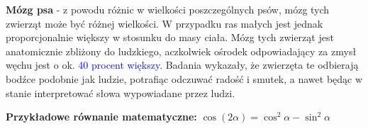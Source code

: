 \textbf{Mózg psa} - z powodu różnic w wielkości poszczególnych psów, mózg tych zwierząt może być różnej wielkości. W przypadku ras małych jest jednak proporcjonalnie większy w stosunku do masy ciała. Mózg tych zwierząt jest anatomicznie zbliżony do ludzkiego, aczkolwiek ośrodek odpowiadający za zmysł węchu jest o ok. \textcolor{blue}{40 procent większy}. Badania wykazały, że zwierzęta te odbierają bodźce podobnie jak ludzie, potrafiąc odczuwać radość i smutek, a nawet będąc w stanie interpretować słowa wypowiadane przez ludzi.

\hspace{1cm} \hline \hspace{1cm}
\begin{center}
\textbf{Przykładowe równanie matematyczne:}
\hspace{3cm}
$\cos (2\alpha) = \cos^2 \alpha - \sin^2 \alpha$
\end{center}